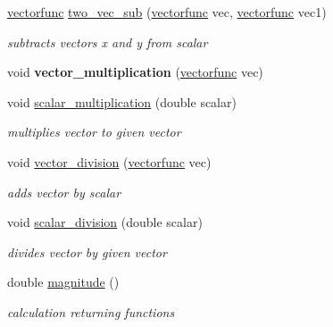 \begin{DoxyCompactItemize}
\mbox{\hyperlink{classvectorfunc}{vectorfunc}} \mbox{\hyperlink{classvectorfunc_a955371edddd4e7798c3bdd041de7fe80}{two\+\_\+vec\+\_\+sub}} (\mbox{\hyperlink{classvectorfunc}{vectorfunc}} vec, \mbox{\hyperlink{classvectorfunc}{vectorfunc}} vec1)
\begin{DoxyCompactList}\small\item\em subtracts vector\textquotesingle{}s x and y from scalar \end{DoxyCompactList}\item 
\mbox{\label{classvectorfunc_a907a985920a17de29945192e16cd49c9}} 
void {\bfseries vector\+\_\+multiplication} (\mbox{\hyperlink{classvectorfunc}{vectorfunc}} vec)
\item 
\mbox{\label{classvectorfunc_a326234c6552cda2a79b191c867358c29}} 
void \mbox{\hyperlink{classvectorfunc_a326234c6552cda2a79b191c867358c29}{scalar\+\_\+multiplication}} (double scalar)
\begin{DoxyCompactList}\small\item\em multiplies vector to given vector \end{DoxyCompactList}\item 
\mbox{\label{classvectorfunc_ac12a8e822c2044f8cf2ac77931ed021a}} 
void \mbox{\hyperlink{classvectorfunc_ac12a8e822c2044f8cf2ac77931ed021a}{vector\+\_\+division}} (\mbox{\hyperlink{classvectorfunc}{vectorfunc}} vec)
\begin{DoxyCompactList}\small\item\em adds vector by scalar \end{DoxyCompactList}\item 
\mbox{\label{classvectorfunc_a0749647215d28b80ac293715d7841cc7}} 
void \mbox{\hyperlink{classvectorfunc_a0749647215d28b80ac293715d7841cc7}{scalar\+\_\+division}} (double scalar)
\begin{DoxyCompactList}\small\item\em divides vector by given vector \end{DoxyCompactList}\item 
double \mbox{\hyperlink{classvectorfunc_ad57efcec7f489fdfff980fc12706d9c6}{magnitude}} ()
\begin{DoxyCompactList}\small\item\em calculation returning functions \end{DoxyCompactList}\item 

\end{DoxyCompactItemize}
